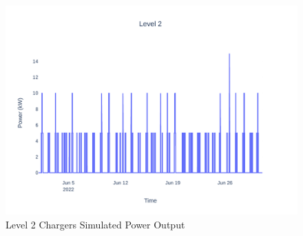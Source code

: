 \documentclass[conference]{IEEEtran}
\begin{document}
			\begin{figure}[H]
				\centering
				\includegraphics[width=1\linewidth]{Fig/l2_g_pad_poisson_June}
				\caption{Level 2 Chargers Simulated Power Output}
				\label{fig:l2gpadpoissonjune}
			\end{figure}
    
\end{document}

